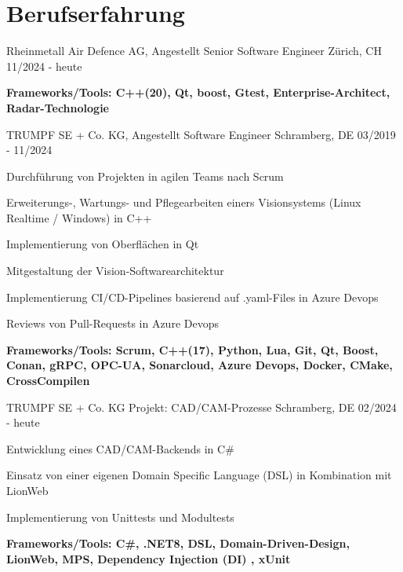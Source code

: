 \section{Berufserfahrung}

\cventry
{Rheinmetall Air Defence AG, Angestellt} %
{Senior Software Engineer } %
{Zürich, CH} %
{11/2024 - heute} %
\begin{cvitems}
\item{\textbf{Frameworks/Tools:  C++(20), Qt, boost, Gtest, Enterprise-Architect, Radar-Technologie }}
\end{cvitems}

\cventry
{TRUMPF SE + Co. KG, Angestellt} %
{Software Engineer } %
{Schramberg, DE} %
{03/2019 - 11/2024} %
\begin{cvitems}
\item{Durchführung von Projekten in agilen Teams nach Scrum}
\item{ Erweiterungs-, Wartungs- und Pflegearbeiten einers Visionsystems (Linux Realtime / Windows) in C++}
\item{Implementierung von Oberflächen in Qt}
\item{Mitgestaltung der Vision-Softwarearchitektur}
\item{Implementierung CI/CD-Pipelines basierend auf .yaml-Files in Azure Devops}
\item{ Reviews von Pull-Requests in Azure Devops}
\item{\textbf{Frameworks/Tools:  Scrum,  C++(17), Python, Lua, Git, Qt, Boost, Conan, gRPC, OPC-UA, Sonarcloud, Azure Devops, Docker, CMake, CrossCompilen}}
\end{cvitems}

\cventry
{TRUMPF SE + Co. KG} %
{Projekt: CAD/CAM-Prozesse} %
{Schramberg, DE} %
{02/2024 - heute} %
\begin{cvitems}
	\item{Entwicklung eines CAD/CAM-Backends  in C\#}
	\item{Einsatz von einer eigenen Domain Specific Language (DSL) in Kombination mit LionWeb}
	\item{Implementierung von Unittests und Modultests}
	\item{\textbf{Frameworks/Tools: C\#, .NET8, DSL, Domain-Driven-Design, LionWeb, MPS,  Dependency Injection (DI) , xUnit}}
\end{cvitems}

